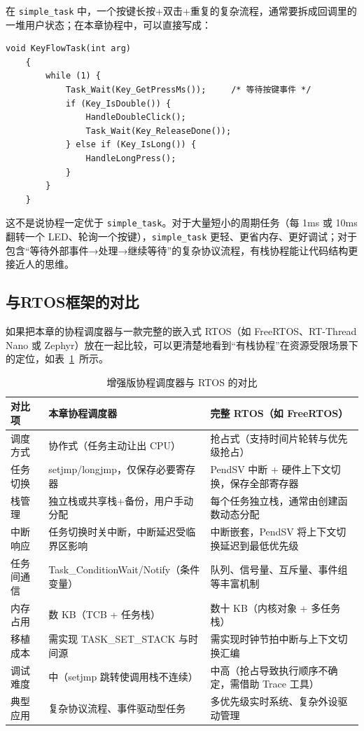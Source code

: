 在 \texttt{simple\_task} 中，一个按键长按+双击+重复的复杂流程，通常要拆成回调里的一堆用户状态；在本章协程中，可以直接写成：

\begin{lstlisting}[style=c]
	void KeyFlowTask(int arg)
	{
		while (1) {
			Task_Wait(Key_GetPressMs());     /* 等待按键事件 */
			if (Key_IsDouble()) {
				HandleDoubleClick();
				Task_Wait(Key_ReleaseDone());
			} else if (Key_IsLong()) {
				HandleLongPress();
			}
		}
	}
\end{lstlisting}

这不是说协程一定优于 \texttt{simple\_task}。对于大量短小的周期任务（每 1ms 或 10ms 翻转一个 LED、轮询一个按键），\texttt{simple\_task} 更轻、更省内存、更好调试；对于包含“等待外部事件→处理→继续等待”的复杂协议流程，有栈协程能让代码结构更接近人的思维。

\subsection{与RTOS框架的对比}

如果把本章的协程调度器与一款完整的嵌入式 RTOS（如 FreeRTOS、RT-Thread Nano 或 Zephyr）放在一起比较，可以更清楚地看到“有栈协程”在资源受限场景下的定位，如表~\ref{tab:coro-vs-rtos}~所示。

\begin{table}[htbp]
	\centering
	\small
	\caption{增强版协程调度器与 RTOS 的对比}
	\label{tab:coro-vs-rtos}
	\begin{tabularx}{\textwidth}{l X X}
		\toprule
		对比项 & 本章协程调度器 & 完整 RTOS（如 FreeRTOS） \\
		\midrule
		调度方式 & 协作式（任务主动让出 CPU） & 抢占式（支持时间片轮转与优先级抢占） \\
		任务切换 & setjmp/longjmp，仅保存必要寄存器 &  PendSV 中断 + 硬件上下文切换，保存全部寄存器 \\
		栈管理 & 独立栈或共享栈+备份，用户手动分配 & 每个任务独立栈，通常由创建函数动态分配 \\
		中断响应 & 任务切换时关中断，中断延迟受临界区影响 & 中断嵌套，PendSV 将上下文切换延迟到最低优先级 \\
		任务间通信 & Task\_ConditionWait/Notify（条件变量） & 队列、信号量、互斥量、事件组等丰富机制 \\
		内存占用 & 数 KB（TCB + 任务栈） & 数十 KB（内核对象 + 多任务栈） \\
		移植成本 & 需实现 TASK\_SET\_STACK 与时间源 & 需实现时钟节拍中断与上下文切换汇编 \\
		调试难度 & 中（setjmp 跳转使调用栈不连续） & 中高（抢占导致执行顺序不确定，需借助 Trace 工具） \\
		典型应用 & 复杂协议流程、事件驱动型任务 & 多优先级实时系统、复杂外设驱动管理 \\
		\bottomrule
	\end{tabularx}
\end{table}

